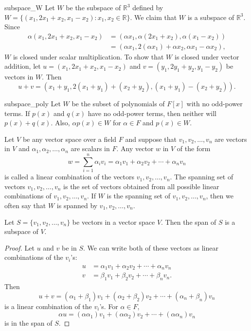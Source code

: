  
\begin{example}{subspace_W}
Let $W$ be the subspace of ${\mathbb R}^3$ defined by $W = \{ (x_1, 2 x_1
+ x_2, x_1 - x_2) : x_1, x_2 \in {\mathbb R} \}$. We claim that $W$ is a 
subspace of ${\mathbb R}^3$.  Since 
\begin{align*}
\alpha (x_1, 2 x_1 + x_2, x_1 - x_2) 
& =  (\alpha x_1, \alpha(2 x_1 + x_2), \alpha( x_1 - x_2)) \\
& =  (\alpha x_1, 2(\alpha x_1) + \alpha x_2, \alpha x_1 -\alpha x_2),
\end{align*}
$W$ is closed under scalar multiplication. To show that $W$ is closed
under vector addition, let $u = (x_1, 2 x_1 + x_2, x_1 - x_2)$ and $v
= (y_1, 2 y_1 + y_2, y_1 - y_2)$ be vectors in $W$. Then
\[
u + v = 
(x_1 + y_1, 2( x_1 + y_1) +( x_2 + y_2), (x_1 + y_1) - (x_2+ y_2)).
\]
\end{example}
 
 
 
\begin{example}{subspace_poly}
Let $W$ be the subset of polynomials of $F[x]$ with no odd-power
terms. If $p(x)$ and $q(x)$ have no odd-power terms, then neither will 
$p(x) + q(x)$.  Also, $\alpha p(x) \in W$ for $\alpha \in F$ and $p(x)
\in W$.
\end{example}
  

Let $V$ be any vector space over a field $F$ and suppose that $v_1,
v_2, \ldots, v_n$ are vectors in $V$ and $\alpha_1, \alpha_2, \ldots,
\alpha_n$ are scalars in $F$. Any vector $w$ in $V$ of the form
\[
w = \sum_{i=1}^n \alpha_i v_i = \alpha_1 v_1 + \alpha_2 v_2 + \cdots + \alpha_n v_n
\]
is called a {\bfi linear combination\/} of the
vectors $v_1, v_2, \ldots, v_n$. The {\bfi spanning
set\/} of vectors $v_1, v_2, \ldots, v_n$ is the
set of vectors obtained from all possible linear combinations of
$v_1, v_2, \ldots, v_n$. If $W$ is the spanning set of $v_1, v_2,
\ldots, v_n$, then we often say that $W$ is {\bfi spanned\/} by $v_1,
v_2, \ldots, v_n$. 
 
 
\begin{proposition}
Let $S= \{v_1, v_2, \ldots, v_n \}$ be vectors in a vector space $V$.
Then the span of $S$ is a subspace of $V$. 
\end{proposition}


\begin{proof}
Let $u$ and $v$ be in $S$. We can write both of these vectors as 
linear combinations of the $v_i$'s:
\begin{align*}
u & =  \alpha_1 v_1 + \alpha_2 v_2 + \cdots + \alpha_n v_n \\
v & =  \beta_1 v_1 + \beta_2 v_2 + \cdots + \beta_n v_n.
\end{align*}
Then
\[
u+ v =( \alpha_1 + \beta_1) v_1 + (\alpha_2+ \beta_2) v_2 + \cdots +
(\alpha_n + \beta_n) v_n 
\]
is a linear combination of the $v_i$'s. For $\alpha \in F$,
\[
\alpha u = (\alpha \alpha_1) v_1 + ( \alpha \alpha_2) v_2 + \cdots +
(\alpha \alpha_n ) v_n 
\]
is in the span of $S$.
\end{proof}


